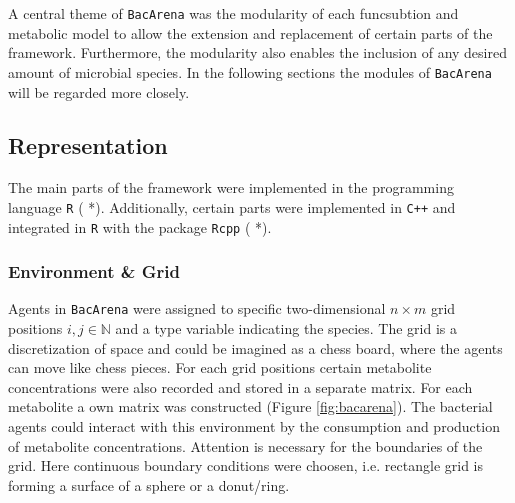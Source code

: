 A central theme of \texttt{BacArena} was the modularity of each funcsubtion and metabolic model to allow the extension and replacement of certain parts of the framework. Furthermore, the modularity also enables the inclusion of any desired amount of microbial species. In the following sections the modules of \texttt{BacArena} will be regarded more closely. 

\subsection{Representation}
The main parts of the framework were implemented in the programming language \texttt{R} ( *). Additionally, certain parts were implemented in \texttt{C++} and integrated in \texttt{R} with the package \texttt{Rcpp} ( *).

\subsubsection{Environment \& Grid}
Agents in \texttt{BacArena} were assigned to specific two-dimensional $n \times m$ grid positions $i, j \in \mathbb{N}$ and a type variable indicating the species. The grid is a discretization of space and could be imagined as a chess board, where the agents can move like chess pieces. For each grid positions certain metabolite concentrations were also recorded and stored in a separate matrix. For each metabolite a own matrix was constructed (Figure \hyperref[fig:bacarena]{\ref{fig:bacarena}}). The bacterial agents could interact with this environment by the consumption and production of metabolite concentrations.
Attention is necessary for the boundaries of the grid.
Here continuous boundary conditions were choosen, i.e. rectangle grid is forming a surface of a sphere or a donut/ring.


